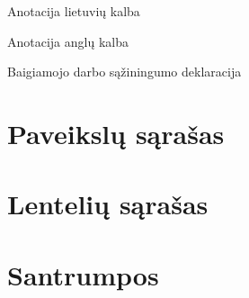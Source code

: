 \documentclass[12pt]{article}
\begin{document}
\begin{titlepage}
\centering

    {\Large Anotacija lietuvių kalba}

\end{titlepage}
\newpage


\begin{titlepage}
\centering

    {\Large Anotacija anglų kalba}

\end{titlepage}
\newpage


\begin{titlepage}
\centering

    {\Large Baigiamojo darbo sąžiningumo deklaracija}

\end{titlepage}
\newpage


    \tableofcontents

\newpage


\section*{Paveikslų sąrašas}


\newpage


\section*{Lentelių sąrašas}


\newpage


\section*{Santrumpos}


\newpage

\end{document}
